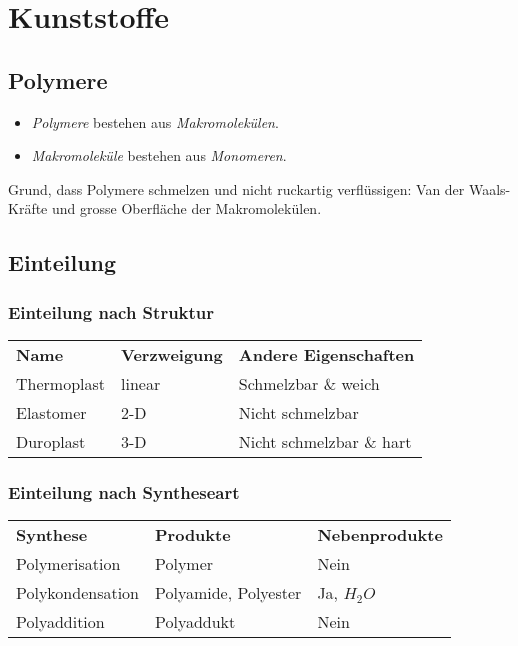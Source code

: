 \section{Kunststoffe}

\subsection{Polymere}

\begin{itemize}
	\item \textit{Polymere} bestehen aus \textit{Makromolekülen}.
	\item \textit{Makromoleküle} bestehen aus \textit{Monomeren}.
\end{itemize}

Grund, dass Polymere schmelzen und nicht ruckartig verflüssigen: Van der Waals-Kräfte und grosse Oberfläche der Makromolekülen.

\subsection{Einteilung}

\subsubsection{Einteilung nach Struktur}

\begin{center}
	\begin{tabular}{l l l}
		\textbf{Name} & \textbf{Verzweigung} & \textbf{Andere Eigenschaften} \\
		Thermoplast & linear & Schmelzbar \& weich \\
		Elastomer & 2-D & Nicht schmelzbar \\
		Duroplast & 3-D & Nicht schmelzbar \& hart
	\end{tabular}
\end{center}

\subsubsection{Einteilung nach Syntheseart}

\begin{center}
	\begin{tabular}{l l l}
		\textbf{Synthese} & \textbf{Produkte} & \textbf{Nebenprodukte} \\
		Polymerisation & Polymer & Nein \\
		Polykondensation & Polyamide, Polyester & Ja, $H_2O$\\
		Polyaddition & Polyaddukt & Nein
	\end{tabular}
\end{center}

